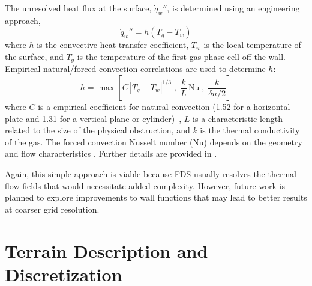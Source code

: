 \documentclass[journal,article,atmosphere,submit,moreauthors,pdftex]{Definitions/mdpi}
\begin{document}
The unresolved heat flux at the surface, $\dot{q}_w''$, is determined using an engineering approach,
\begin{equation}
\dot{q}_w'' = h (T_g - T_w) 
\end{equation}
where $h$ is the convective heat transfer coefficient, $T_w$ is the local temperature of the surface, and $T_g$ is the temperature of the first gas phase cell off the wall.  Empirical natural/forced convection correlations are used to determine $h$:
\begin{equation}
h = \max \left[C\, |T_g-T_w|^{1/3} \; , \;
\frac{k}{L} \, \mathrm{Nu} \; , \;
\frac{k}{\delta n/2} \right]
\label{eq:qconv}
\end{equation}
where $C$ is a empirical coefficient for natural convection (1.52 for a horizontal plate and 1.31 for a vertical plane or cylinder)~\cite{Holman:1}, $L$ is a characteristic length related to the size of the physical obstruction, and $k$ is the thermal conductivity of the gas. The forced convection Nusselt number (Nu) depends on the geometry and flow characteristics \cite{Holman:1,Incropera:1}.  Further details are provided in \cite{FDS_Math_Guide}.

Again, this simple approach is viable because FDS usually resolves the thermal flow fields that would necessitate added complexity.  However, future work is planned to explore improvements to wall functions that may lead to better results at coarser grid resolution.


\section{Terrain Description and Discretization} \label{sec:terraindisc}
\end{document}
